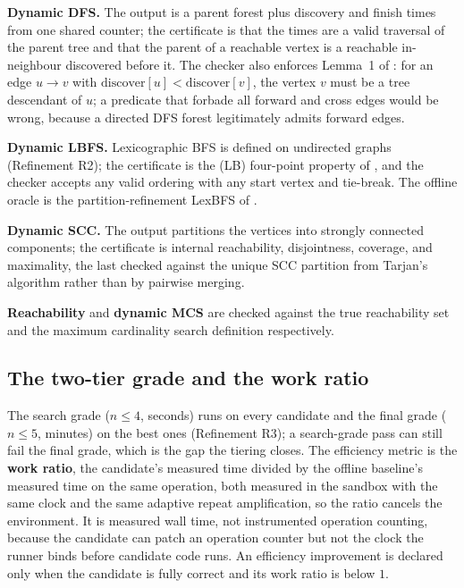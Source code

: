 \textbf{Dynamic DFS.} The output is a parent forest plus discovery and finish
times from one shared counter; the certificate is that the times are a valid
traversal of the parent tree and that the parent of a reachable vertex is a
reachable in-neighbour discovered before it. The checker also enforces
Lemma~1 of \citet{yang2019dynamic}: for an edge $u \to v$ with
$\text{discover}[u] < \text{discover}[v]$, the vertex $v$ must be a tree
descendant of $u$; a predicate that forbade all forward and cross edges would be
wrong, because a directed DFS forest legitimately admits forward edges.

\textbf{Dynamic LBFS.} Lexicographic BFS is defined on undirected graphs
(Refinement R2); the certificate is the (LB) four-point property of
\citet{corneil2008unified}, and the checker accepts any valid ordering with any
start vertex and tie-break. The offline oracle is the partition-refinement LexBFS
of \citet{habib2000lexbfs}.

\textbf{Dynamic SCC.} The output partitions the vertices into strongly connected
components; the certificate is internal reachability, disjointness, coverage,
and maximality, the last checked against the unique SCC partition from Tarjan's
algorithm \citep{tarjan1972dfs} rather than by pairwise merging.

\textbf{Reachability} and \textbf{dynamic MCS} are checked against the true
reachability set and the maximum cardinality search definition
\citep{tarjan1984mcs,rose1976algorithmic} respectively.

\subsection{The two-tier grade and the work ratio}

The search grade ($n \le 4$, seconds) runs on every candidate and the final grade
($n \le 5$, minutes) on the best ones (Refinement R3); a search-grade pass can
still fail the final grade, which is the gap the tiering closes. The efficiency metric is the \textbf{work ratio}, the candidate's measured time
divided by the offline baseline's measured time on the same operation, both
measured in the sandbox with the same clock and the same adaptive repeat
amplification, so the ratio cancels the environment. It is measured wall time,
not instrumented operation counting, because the candidate can patch an operation
counter but not the clock the runner binds before candidate code runs. An
efficiency improvement is declared only when the candidate is fully correct and
its work ratio is below $1$.

